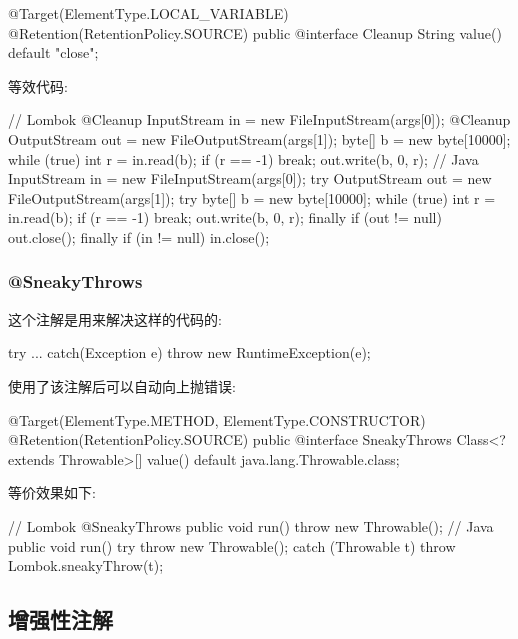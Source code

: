 \begin{Java}
@Target(ElementType.LOCAL_VARIABLE)
@Retention(RetentionPolicy.SOURCE)
public @interface Cleanup {
	String value() default "close";
}
\end{Java}

等效代码:

\begin{Java}
// Lombok
@Cleanup InputStream in = new FileInputStream(args[0]);
@Cleanup OutputStream out = new FileOutputStream(args[1]);
byte[] b = new byte[10000];
while (true) {
    int r = in.read(b);
    if (r == -1) break;
    out.write(b, 0, r);
}
// Java
InputStream in = new FileInputStream(args[0]);
    try {
        OutputStream out = new FileOutputStream(args[1]);
        try {
            byte[] b = new byte[10000];
            while (true) {
                int r = in.read(b);
                if (r == -1) break;
                out.write(b, 0, r);
            }
        } finally {
            if (out != null) {
                out.close();
            }
        }
    } finally {
        if (in != null) {
            in.close();
        }
    }
\end{Java}

\subsubsection{@SneakyThrows}

这个注解是用来解决这样的代码的:

\begin{Java}
try{
    ...
}catch(Exception e){
    throw new RuntimeException(e);
}
\end{Java}

使用了该注解后可以自动向上抛错误:

\begin{Java}
@Target({ElementType.METHOD, ElementType.CONSTRUCTOR})
@Retention(RetentionPolicy.SOURCE)
public @interface SneakyThrows {
    Class<? extends Throwable>[] value() default java.lang.Throwable.class;
}
\end{Java}

等价效果如下:

\begin{Java}
// Lombok
@SneakyThrows
public void run() {
    throw new Throwable();
}
// Java
public void run() {
    try {
        throw new Throwable();
    } catch (Throwable t) {
        throw Lombok.sneakyThrow(t);
    }
}
\end{Java}

\subsection{增强性注解}

